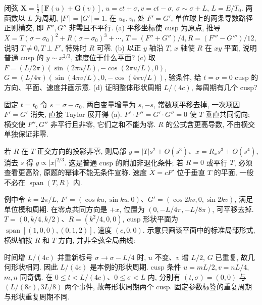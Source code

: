 \begin{exercise}
闭弦 $\boldsymbol X=\frac12[\boldsymbol F(u)+\boldsymbol G(v)]$, $u=ct+\sigma,v=ct-\sigma$, $\sigma\sim\sigma+L$, $L=E/T_0$. 两函数以 $L$ 为周期, $|F'|=|G'|=1$. 在 $u_0,v_0$ 处 $F'=G'$, 单位球上的两条导数路径正则横交, 即 $F'',G''$ 非零且不平行.
(a) 平移坐标使 cusp 为原点, 推导 $X=T(\sigma-\sigma_0)^2+R(\sigma-\sigma_0)^3+\cdots$, $T=(F''+G'')/4,R=(F'''-G''')/12$, 说明 $T\ne0,T\perp F'$, 特殊时 $R$ 可零.
(b) 以正 $y$ 轴沿 $T$, $x$ 轴使 $R$ 在 $xy$ 平面, 说明普通 cusp 的 $y\sim x^{2/3}$, 速度位于什么平面?
(c) 取 $F=(L/2\pi)(\sin(2\pi u/L),-\cos(2\pi u/L),0)$, $G=(L/4\pi)(\sin(4\pi v/L),0,-\cos(4\pi v/L))$, 验条件, 给 $t=\sigma=0$ cusp 的方向、平面、速度并画示意.
(d) 证明整体形状周期 $L/(4c)$, 每周期有几个 cusp?
\end{exercise}
\begin{solution}
固定 $t=t_0$ 令 $s=\sigma-\sigma_0$, 两自变量增量为 $s,-s$, 常数项平移去掉, 一次项因 $F'=G'$ 消失, 直接 Taylor 展开得 (a). $F'\cdot F''=G'\cdot G''=0$ 使 $T$ 垂直共同切向; 横交使 $F'',G''$ 非平行且非零, 它们之和不能为零. $R$ 的公式含更高导数, 不由横交单独保证非零.

若 $R$ 在 $T$ 正交方向的投影非零, 则局部 $y=|T|s^2+O(s^3)$、$x=R_xs^3+O(s^4)$, 消去 $s$ 得 $y\propto|x|^{2/3}$. 这是普通 cusp 的附加非退化条件; 若 $R=0$ 或平行 $T$, 必须查看更高阶, 原题的幂律不能无条件宣称. 速度 $\dot X=cF'$ 位于垂直 $T$ 的平面, 一般不必在 $\operatorname{span}(T,R)$ 内.

例中令 $k=2\pi/L$, $F'=(\cos ku,\sin ku,0)$、$G'=(\cos2kv,0,\sin2kv)$, 满足单位模和周期. 在零点共同方向是 $+x$, 位置为 $(0,-L/4\pi,-L/8\pi)$, 可平移去掉. $T=(0,k/4,k/2)$、$R=(k^2/4,0,0)$, cusp 形状平面为 $\operatorname{span}[(1,0,0),(0,1,2)]$, 速度 $(c,0,0)$. 示意只画该平面中的标准局部形式, 横纵轴按 $R$ 和 $T$ 方向, 并非全弦全局曲线:
\begin{center}\end{center}
时间增 $L/(4c)$ 并重新标号 $\sigma\to\sigma-L/4$ 时, $u$ 不变、$v$ 增 $L/2$, $G$ 已重复, 故几何形状相同. 因此 $L/(4c)$ 是本例的形状周期. cusp 条件 $u=mL/2,v=nL/4$, $m,n$ 同奇偶. 在 $0\le t<L/(4c)$、$0\le\sigma<L$ 内, 分别有 $(t,\sigma)=(0,0)$ 与 $(L/(8c),3L/8)$ 两个事件, 故每形状周期两个 cusp. 固定参数标签的重复周期与形状重复周期不同.
\end{solution}

